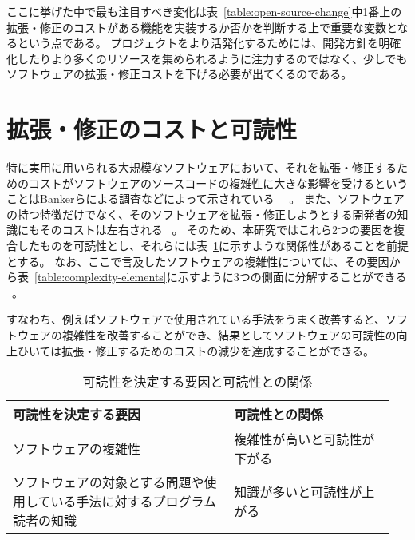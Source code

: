 ここに挙げた中で最も注目すべき変化は表~\ref{table:open-source-change}中1番上の拡張・修正のコストがある機能を実装するか否かを判断する上で重要な変数となるという点である。
プロジェクトをより活発化するためには、開発方針を明確化したりより多くのリソースを集められるように注力するのではなく、少しでもソフトウェアの拡張・修正コストを下げる必要が出てくるのである。

\section{拡張・修正のコストと可読性}
\label{open-source:readability}

特に実用に用いられる大規模なソフトウェアにおいて、それを拡張・修正するためのコストがソフトウェアのソースコードの複雑性に大きな影響を受けるということはBankerらによる調査などによって示されている~\cite{banker-datar} ~\cite{banker-davis}。
また、ソフトウェアの持つ特徴だけでなく、そのソフトウェアを拡張・修正しようとする開発者の知識にもそのコストは左右される ~\cite{elshoff}。
そのため、本研究ではこれら2つの要因を複合したものを可読性とし、それらには表~\ref{table:readability-relation}に示すような関係性があることを前提とする。
なお、ここで言及したソフトウェアの複雑性については、その要因から表~\ref{table:complexity-elements}に示すように3つの側面に分解することができる ~\cite{yu}。

すなわち、例えばソフトウェアで使用されている手法をうまく改善すると、ソフトウェアの複雑性を改善することができ、結果としてソフトウェアの可読性の向上ひいては拡張・修正するためのコストの減少を達成することができる。

\begin{table}[!hbtp]
    \begin{center}
        \caption{可読性を決定する要因と可読性との関係}
        \begin{tabular}{|p{0.55\linewidth}|p{0.4\linewidth}|}
            \hline
            可読性を決定する要因 & 可読性との関係 \\
            \hline
            \hline
            ソフトウェアの複雑性 & 複雑性が高いと可読性が下がる \\
            \hline
            ソフトウェアの対象とする問題や使用している手法に対するプログラム読者の知識 & 知識が多いと可読性が上がる \\
            \hline
        \end{tabular}
        \label{table:readability-relation}
    \end{center}
\end{table}

